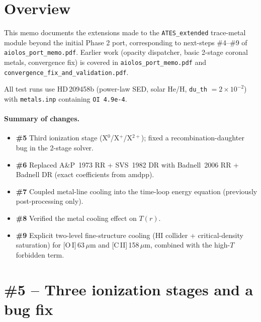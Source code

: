 \documentclass[english,a4paper]{kiseon_memo}
\begin{document}
\section{Overview}

\begin{sloppypar}
This memo documents the extensions made to the \texttt{ATES\_extended}
trace-metal module beyond the initial Phase 2 port, corresponding to
next-steps \#4--\#9 of \texttt{aiolos\_port\_memo.pdf}.  Earlier work
(opacity dispatcher, basic 2-stage coronal metals, convergence fix) is
covered in \texttt{aiolos\_port\_memo.pdf} and
\texttt{convergence\_fix\_and\_validation.pdf}.
\end{sloppypar}

All test runs use HD\,209458b (power-law SED, solar He/H, \texttt{du\_th}
$=2\times10^{-2}$) with \texttt{metals.inp} containing \texttt{OI 4.9e-4}.

\paragraph{Summary of changes.}
\begin{itemize}
\item \textbf{\#5} Third ionization stage (X$^0$/X$^+$/X$^{2+}$);
  fixed a recombination-daughter bug in the 2-stage solver.
\item \textbf{\#6} Replaced A\&P~1973 RR + SVS~1982 DR with
  Badnell~2006 RR + Badnell DR (exact coefficients from amdpp).
\item \textbf{\#7} Coupled metal-line cooling into the time-loop energy
  equation (previously post-processing only).
\item \textbf{\#8} Verified the metal cooling effect on $T(r)$.
\item \textbf{\#9} Explicit two-level fine-structure cooling (HI
  collider + critical-density saturation) for [O\,I]\,63\,$\mu$m and
  [C\,II]\,158\,$\mu$m, combined with the high-$T$ forbidden term.
\end{itemize}

\section{\#5 -- Three ionization stages and a bug fix}
\end{document}
